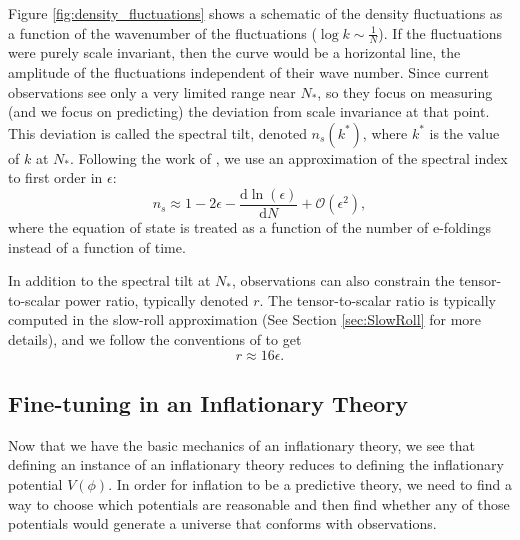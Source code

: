 \documentclass[a4paper,11pt]{article}
\def\d{\mathrm{d}}
\begin{document}
Figure \ref{fig:density_fluctuations} shows a schematic of the density fluctuations as a function of the wavenumber of the fluctuations ($\log k\sim\tfrac{1}{N}$). If the fluctuations were purely scale invariant, then the curve would be a horizontal line, the amplitude of the fluctuations independent of their wave number. Since current observations see only a very limited range near $N_*$, so they focus on measuring (and we focus on predicting) the deviation from scale invariance at that point. This deviation is called the spectral tilt, denoted $n_s(k^*)$, where $k^*$ is the value of $k$ at $N_*$. Following the work of \citet{Wang+1997}, we use an approximation of the spectral index to first order in $\epsilon$:
\begin{equation}
n_s \approx 1 - 2\epsilon - \frac{\d \ln(\epsilon)}{\d N} + \mathcal{O}(\epsilon^2),
\label{eqn:ns_def}
\end{equation}
where the equation of state is treated as a function of the number of e-foldings instead of a function of time. 

In addition to the spectral tilt at $N_*$, observations can also constrain the tensor-to-scalar power ratio, typically denoted $r$. The tensor-to-scalar ratio is typically computed in the slow-roll approximation (See Section \ref{sec:SlowRoll} for more details), and we follow the conventions of \citet{Planck2013} to get 
\begin{equation}
r \approx 16 \epsilon.
\end{equation}


\subsection{Fine-tuning in an Inflationary Theory}
Now that we have the basic mechanics of an inflationary theory, we see that defining an instance of an inflationary theory reduces to defining the inflationary potential $V(\phi)$. In order for inflation to be a predictive theory, we need to find a way to choose which potentials are reasonable and then find whether any of those potentials would generate a universe that conforms with observations. 
\end{document}
